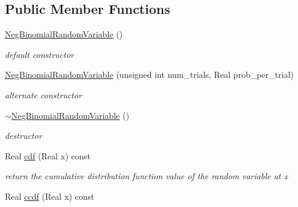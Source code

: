 \subsection*{Public Member Functions}
\begin{DoxyCompactItemize}
\item 
\hyperlink{classPecos_1_1NegBinomialRandomVariable_ad316e61ae4871f5e06b10612ab0d47e6}{Neg\+Binomial\+Random\+Variable} ()\label{classPecos_1_1NegBinomialRandomVariable_ad316e61ae4871f5e06b10612ab0d47e6}

\begin{DoxyCompactList}\small\item\em default constructor \end{DoxyCompactList}\item 
\hyperlink{classPecos_1_1NegBinomialRandomVariable_a4f9bdbb72070afdf5347238f29340c28}{Neg\+Binomial\+Random\+Variable} (unsigned int num\+\_\+trials, Real prob\+\_\+per\+\_\+trial)\label{classPecos_1_1NegBinomialRandomVariable_a4f9bdbb72070afdf5347238f29340c28}

\begin{DoxyCompactList}\small\item\em alternate constructor \end{DoxyCompactList}\item 
\hyperlink{classPecos_1_1NegBinomialRandomVariable_ae28e9edc07dedaa7c2a257fe32bc06ba}{$\sim$\+Neg\+Binomial\+Random\+Variable} ()\label{classPecos_1_1NegBinomialRandomVariable_ae28e9edc07dedaa7c2a257fe32bc06ba}

\begin{DoxyCompactList}\small\item\em destructor \end{DoxyCompactList}\item 
Real \hyperlink{classPecos_1_1NegBinomialRandomVariable_addd564e7f4f314e12d38df74d845f0d8}{cdf} (Real x) const \label{classPecos_1_1NegBinomialRandomVariable_addd564e7f4f314e12d38df74d845f0d8}

\begin{DoxyCompactList}\small\item\em return the cumulative distribution function value of the random variable at x \end{DoxyCompactList}\item 
Real \hyperlink{classPecos_1_1NegBinomialRandomVariable_a23c3b599e7e4788a9a5e9e93c3dbaf4d}{ccdf} (Real x) const \label{classPecos_1_1NegBinomialRandomVariable_a23c3b599e7e4788a9a5e9e93c3dbaf4d}


\end{DoxyCompactItemize}
